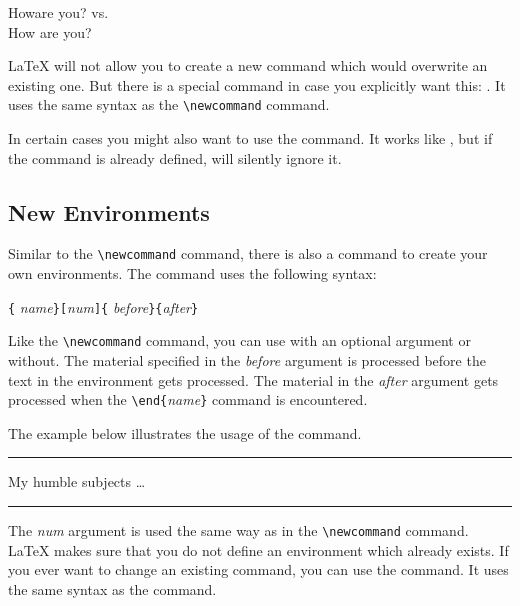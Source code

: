 \begin{example}
\newcommand{\foo}{How}
\foo are you?
\quad vs. \\
\foo{} are you?
\end{example}

\LaTeX{} will not allow you to create a new command which would
overwrite an existing one. But there is a special command in case you
explicitly want this: .
It uses the same syntax as the \verb|\newcommand|
command.

In certain cases you might also want to use the 
command. It works like , but if the command is
already defined, \LaTeXe{} will silently ignore it.

\subsection{New Environments}
Similar to the \verb|\newcommand| command, there is also a command
to create your own environments. The  command uses the
following syntax:

\begin{command}
\verb|{|%
       \emph{name}\verb|}[|\emph{num}\verb|]{|%
       \emph{before}\verb|}{|\emph{after}\verb|}|
\end{command}

Like the \verb|\newcommand| command, you can use 
with an optional argument or without. The material specified
in the \emph{before} argument is processed before the text in the 
environment gets processed. The material in the \emph{after} argument gets
processed when the \verb|\end{|\emph{name}\verb|}| command is encountered.

The example below illustrates the usage of the 
command. 
\begin{example}
\newenvironment{king}
 {\rule{1ex}{1ex}%
      \hspace{\stretch{1}}}
 {%
      \rule{1ex}{1ex}}

\begin{king} 
My humble subjects \ldots
\end{king}
\end{example}

The \emph{num} argument is used the same way as in the
\verb|\newcommand| command. \LaTeX{} makes sure that you do not define
an environment which already exists. If you ever want to change an
existing command, you can use the  command. It
uses the same syntax as the  command.

